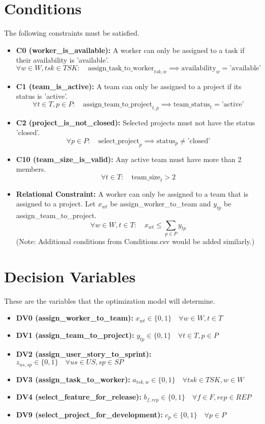 \documentclass{article}
\begin{document}
\section{Conditions}
The following constraints must be satisfied.
\begin{itemize}
    \item \textbf{C0 (worker\_is\_available):} A worker can only be assigned to a task if their availability is 'available'.
    $$ \forall w \in W, tsk \in TSK: \quad \text{assign\_task\_to\_worker}_{tsk, w} \implies \text{availability}_w = \text{'available'} $$
    \item \textbf{C1 (team\_is\_active):} A team can only be assigned to a project if its status is 'active'.
    $$ \forall t \in T, p \in P: \quad \text{assign\_team\_to\_project}_{t, p} \implies \text{team\_status}_t = \text{'active'} $$
    \item \textbf{C2 (project\_is\_not\_closed):} Selected projects must not have the status 'closed'.
    $$ \forall p \in P: \quad \text{select\_project}_p \implies \text{status}_p \neq \text{'closed'} $$
    \item \textbf{C10 (team\_size\_is\_valid):} Any active team must have more than 2 members.
    $$ \forall t \in T: \quad \text{team\_size}_t > 2 $$
    \item \textbf{Relational Constraint:} A worker can only be assigned to a team that is assigned to a project. Let $x_{wt}$ be assign\_worker\_to\_team and $y_{tp}$ be assign\_team\_to\_project.
    $$ \forall w \in W, t \in T: \quad x_{wt} \le \sum_{p \in P} y_{tp} $$
    (Note: Additional conditions from Conditions.csv would be added similarly.)
\end{itemize}

\section{Decision Variables}
These are the variables that the optimization model will determine.
\begin{itemize}
    \item \textbf{DV0 (assign\_worker\_to\_team):} $x_{wt} \in \{0, 1\} \quad \forall w \in W, t \in T$
    \item \textbf{DV1 (assign\_team\_to\_project):} $y_{tp} \in \{0, 1\} \quad \forall t \in T, p \in P$
    \item \textbf{DV2 (assign\_user\_story\_to\_sprint):} $z_{us,sp} \in \{0, 1\} \quad \forall us \in US, sp \in SP$
    \item \textbf{DV3 (assign\_task\_to\_worker):} $a_{tsk,w} \in \{0, 1\} \quad \forall tsk \in TSK, w \in W$
    \item \textbf{DV4 (select\_feature\_for\_release):} $b_{f,rep} \in \{0, 1\} \quad \forall f \in F, rep \in REP$
    \item \textbf{DV9 (select\_project\_for\_development):} $c_p \in \{0, 1\} \quad \forall p \in P$
\end{itemize}
\end{document}
